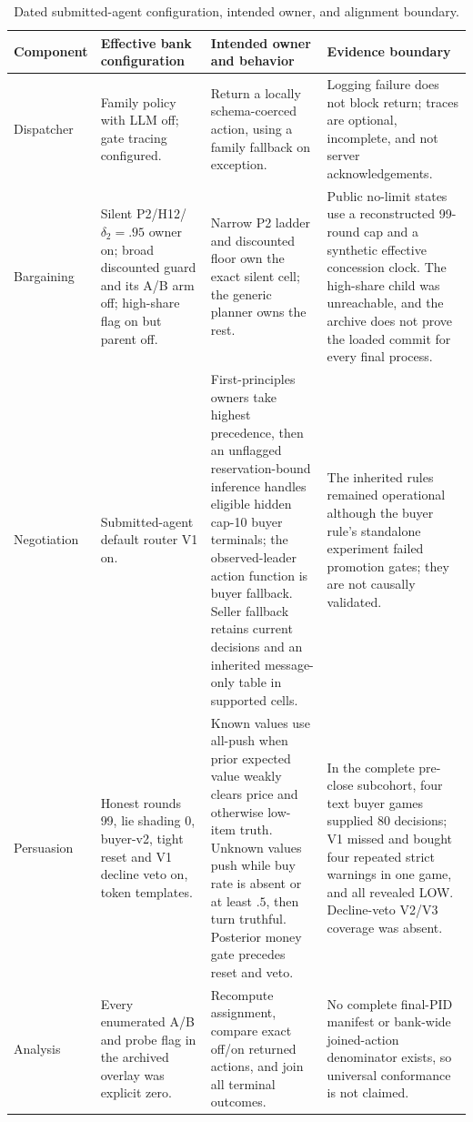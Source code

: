 \begin{table}[h]
\centering
\small
\caption{Dated submitted-agent configuration, intended owner, and alignment boundary.}
\label{tab:alignment}
\begin{tabularx}{\linewidth}{@{}p{2.6cm}p{4.0cm}p{4.0cm}Y@{}}
\toprule
Component & Effective bank configuration & Intended owner and behavior & Evidence boundary \\
\midrule
Dispatcher & Family policy with LLM off; gate tracing configured. & Return a locally schema-coerced action, using a family fallback on exception. & Logging failure does not block return; traces are optional, incomplete, and not server acknowledgements. \\
Bargaining & Silent P2/H12/$\delta_2=.95$ owner on; broad discounted guard and its A/B arm off; high-share flag on but parent off. & Narrow P2 ladder and discounted floor own the exact silent cell; the generic planner owns the rest. & Public no-limit states use a reconstructed 99-round cap and a synthetic effective concession clock. The high-share child was unreachable, and the archive does not prove the loaded commit for every final process. \\
Negotiation & Submitted-agent default router V1 on. & First-principles owners take highest precedence, then an unflagged reservation-bound inference handles eligible hidden cap-10 buyer terminals; the observed-leader action function is buyer fallback. Seller fallback retains current decisions and an inherited message-only table in supported cells. & The inherited rules remained operational although the buyer rule's standalone experiment failed promotion gates; they are not causally validated. \\
Persuasion & Honest rounds 99, lie shading 0, buyer-v2, tight reset and V1 decline veto on, token templates. & Known values use all-push when prior expected value weakly clears price and otherwise low-item truth. Unknown values push while buy rate is absent or at least $.5$, then turn truthful. Posterior money gate precedes reset and veto. & In the complete pre-close subcohort, four text buyer games supplied 80 decisions; V1 missed and bought four repeated strict warnings in one game, and all revealed LOW. Decline-veto V2/V3 coverage was absent. \\
Analysis & Every enumerated A/B and probe flag in the archived overlay was explicit zero. & Recompute assignment, compare exact off/on returned actions, and join all terminal outcomes. & No complete final-PID manifest or bank-wide joined-action denominator exists, so universal conformance is not claimed. \\
\bottomrule
\end{tabularx}
\end{table}

